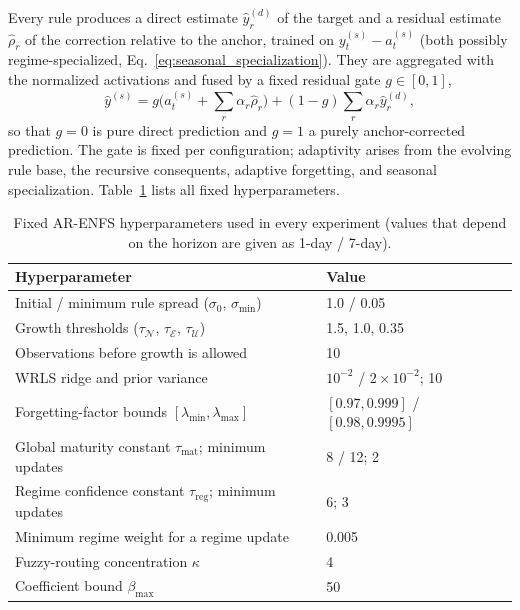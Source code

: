 \documentclass[preprint,12pt]{elsarticle}
\begin{document}
Every rule produces a direct estimate $\widehat{y}^{(d)}_r$ of the target and a residual estimate $\widehat{\rho}_r$ of the correction relative to the anchor, trained on $y_t^{(s)}-a_t^{(s)}$ (both possibly regime-specialized, Eq.~\eqref{eq:seasonal_specialization}). They are aggregated with the normalized activations and fused by a fixed residual gate $g\in[0,1]$,
\begin{equation}
\widehat{y}^{(s)} = g\Big(a_t^{(s)} + \sum_r\alpha_r\widehat{\rho}_r\Big) + (1-g)\sum_r\alpha_r\widehat{y}^{(d)}_r,
\label{eq:residual_fusion}
\end{equation}
so that $g=0$ is pure direct prediction and $g=1$ a purely anchor-corrected prediction. The gate is fixed per configuration; adaptivity arises from the evolving rule base, the recursive consequents, adaptive forgetting, and seasonal specialization. Table~\ref{tab:hyperparameters} lists all fixed hyperparameters.

\begin{table}[!t]
\caption{Fixed AR-ENFS hyperparameters used in every experiment (values that depend on the horizon are given as 1-day / 7-day).}
\label{tab:hyperparameters}
\centering
\small
\begin{tabular}{p{7.6cm}l}
\toprule
\textbf{Hyperparameter} & \textbf{Value} \\
\midrule
Initial / minimum rule spread ($\sigma_0$, $\sigma_{\min}$) & 1.0 / 0.05 \\
Growth thresholds ($\tau_{\mathcal{N}}$, $\tau_{\mathcal{E}}$, $\tau_{\mathcal{U}}$) & 1.5, 1.0, 0.35 \\
Observations before growth is allowed & 10 \\
WRLS ridge and prior variance & $10^{-2}$ / $2\times10^{-2}$; 10 \\
Forgetting-factor bounds $[\lambda_{\min},\lambda_{\max}]$ & $[0.97, 0.999]$ / $[0.98, 0.9995]$ \\
Global maturity constant $\tau_{\mathrm{mat}}$; minimum updates & 8 / 12; 2 \\
Regime confidence constant $\tau_{\mathrm{reg}}$; minimum updates & 6; 3 \\
Minimum regime weight for a regime update & 0.005 \\
Fuzzy-routing concentration $\kappa$ & 4 \\
Coefficient bound $\beta_{\max}$ & 50 \\
\bottomrule
\end{tabular}
\end{table}
\end{document}
